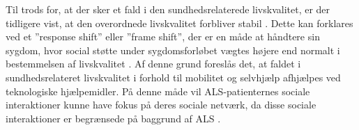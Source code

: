 Til trods for, at der sker et fald i den sundhedsrelaterede livskvalitet, er der tidligere vist, at den overordnede livskvalitet forbliver stabil \citep{ilse2015, neudert2004}. Dette kan forklares ved et ”response shift” eller ”frame shift”, der er en måde at håndtere sin sygdom, hvor social støtte under sygdomsforløbet vægtes højere end normalt i bestemmelsen af livskvalitet \citep{ilse2015}. Af denne grund foreslås det, at faldet i sundhedsrelateret livskvalitet i forhold til mobilitet og selvhjælp afhjælpes ved teknologiske hjælpemidler. På denne måde vil ALS-patienternes sociale interaktioner kunne have fokus på deres sociale netværk, da disse sociale interaktioner er begrænsede på baggrund af ALS \citep{ilse2015,tramonti2012}.







